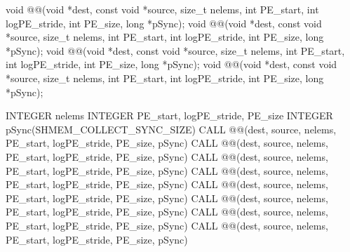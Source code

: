 
\begin{apidefinition}

\begin{Csynopsis}
void @@(void *dest, const void *source, size_t nelems, int PE_start, int logPE_stride, int PE_size, long *pSync);
void @@(void *dest, const void *source, size_t nelems, int PE_start, int logPE_stride, int PE_size, long *pSync);
void @@(void *dest, const void *source, size_t nelems, int PE_start, int logPE_stride, int PE_size, long *pSync);
void @@(void *dest, const void *source, size_t nelems, int PE_start, int logPE_stride, int PE_size, long *pSync);
\end{Csynopsis}

\begin{Fsynopsis}
INTEGER nelems
INTEGER PE_start, logPE_stride, PE_size
INTEGER pSync(SHMEM_COLLECT_SYNC_SIZE)
CALL @@(dest, source, nelems, PE_start, logPE_stride, PE_size, pSync)
CALL @@(dest, source, nelems, PE_start, logPE_stride, PE_size, pSync)
CALL @@(dest, source, nelems, PE_start, logPE_stride, PE_size, pSync)
CALL @@(dest, source, nelems, PE_start, logPE_stride, PE_size, pSync)
CALL @@(dest, source, nelems, PE_start, logPE_stride, PE_size, pSync)
CALL @@(dest, source, nelems, PE_start, logPE_stride, PE_size, pSync)
CALL @@(dest, source, nelems, PE_start, logPE_stride, PE_size, pSync)
CALL @@(dest, source, nelems, PE_start, logPE_stride, PE_size, pSync)
\end{Fsynopsis}

\begin{apiarguments}


\end{apiarguments}
\end{apidefinition}
